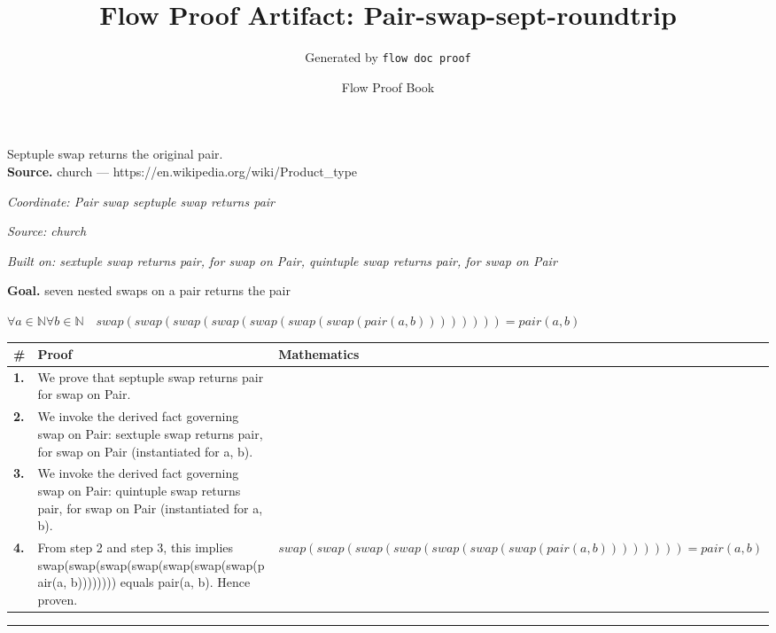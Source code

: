 \documentclass[11pt]{article}
\title{Flow Proof Artifact: Pair-swap-sept-roundtrip}
\author{Generated by \texttt{flow doc proof}}
\date{Flow Proof Book}
\theoremstyle{definition}
\begin{document}
\maketitle
Septuple swap returns the original pair.\\[0.5em]
\textbf{Source.} church — https://en.wikipedia.org/wiki/Product\_type\\[0.5em]
\bigskip
{}\par
\smallskip\noindent\textit{Coordinate: Pair \cdot swap \cdot septuple swap returns pair}\par
\smallskip\noindent\textit{Source: church}\par
\smallskip\noindent\textit{Built on: sextuple swap returns pair, for swap on Pair, quintuple swap returns pair, for swap on Pair}\par
\medskip
\noindent\textbf{Goal.} seven nested swaps on a pair returns the pair\par
\noindent$\displaystyle \forall a \in \mathbb{N} \forall b \in \mathbb{N}\quad swap(swap(swap(swap(swap(swap(swap(pair(a, b)))))))) = pair(a, b)$\par
\medskip
\noindent
\begin{tabular}{@{} >{\raggedright\arraybackslash}p{} >{\raggedright\arraybackslash}p{} >{\raggedleft\arraybackslash}p{} @{}}
\textbf{\#} & \textbf{Proof} & \textbf{Mathematics} \\
\midrule
\textbf{1.} & We prove that septuple swap returns pair for swap on Pair. & \\[0.45em]
\textbf{2.} & We invoke the derived fact governing swap on Pair: sextuple swap returns pair, for swap on Pair (instantiated for a, b). & \\[0.45em]
\textbf{3.} & We invoke the derived fact governing swap on Pair: quintuple swap returns pair, for swap on Pair (instantiated for a, b). & \\[0.45em]
\textbf{4.} & From step 2 and step 3, this implies swap(swap(swap(swap(swap(swap(swap(pair(a, b)))))))) equals pair(a, b). Hence proven. & $\displaystyle swap(swap(swap(swap(swap(swap(swap(pair(a, b)))))))) = pair(a, b)$ \\[0.45em]
\bottomrule
\end{tabular}
\label{thm:Pair-swap-septuple_swap_returns_pair}
\par\medskip\hrule
\end{document}
